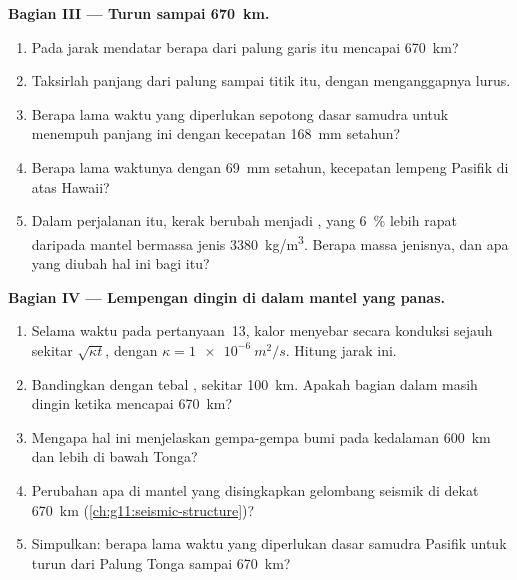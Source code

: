 \begin{problem}
\medskip
\noindent\textbf{Bagian III --- Turun sampai \qty{670}{km}.}
\begin{enumerate}[resume]
  \item Pada jarak mendatar berapa dari palung garis itu mencapai
        \qty{670}{km}?
  \item Taksirlah panjang  dari palung sampai titik itu, dengan
        menganggapnya lurus.
  \item Berapa lama waktu yang diperlukan sepotong dasar samudra untuk menempuh
        panjang ini dengan kecepatan \qty{168}{mm} setahun?
  \item Berapa lama waktunya dengan \qty{69}{mm} setahun, kecepatan lempeng
        Pasifik di atas Hawaii?
  \item Dalam perjalanan itu, kerak  berubah menjadi , yang
        \qty{6}{\percent} lebih rapat daripada mantel bermassa jenis
        \qty{3380}{kg/m^3}. Berapa massa jenisnya, dan apa yang diubah hal ini
        bagi  itu?
\end{enumerate}

\medskip
\noindent\textbf{Bagian IV --- Lempengan dingin di dalam mantel yang panas.}
\begin{enumerate}[resume]
  \item Selama waktu pada pertanyaan~13, kalor menyebar secara konduksi sejauh
        sekitar $\sqrt{\kappa t}$, dengan $\kappa = \qty{1e-6}{m^2/s}$. Hitung
        jarak ini.
  \item Bandingkan dengan tebal , sekitar \qty{100}{km}. Apakah
        bagian dalam  masih dingin ketika mencapai \qty{670}{km}?
  \item Mengapa hal ini menjelaskan gempa-gempa bumi pada kedalaman
        \qty{600}{km} dan lebih di bawah Tonga?
  \item Perubahan apa di mantel yang disingkapkan gelombang seismik di dekat
        \qty{670}{km} (\cref{ch:g11:seismic-structure})?
  \item Simpulkan: berapa lama waktu yang diperlukan dasar samudra Pasifik untuk
        turun dari Palung Tonga sampai \qty{670}{km}?
\end{enumerate}
\end{problem}
